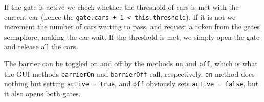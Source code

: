 If the gate is active we check whether the threshold of cars is met with the current car (hence the \texttt{gate.cars + 1 < this.threshold}). If it is not we increment the number of cars waiting to pass, and request a token from the gates semaphore, making the car wait. If the threshold is met, we simply open the gate and release all the cars.

The barrier can be toggled on and off by the methods \texttt{on} and \texttt{off}, which is what the GUI methods \texttt{barrierOn} and \texttt{barrierOff} call, respectively. \texttt{on} method does nothing but setting \texttt{active = true}, and \texttt{off} obviously sets \texttt{active = false}, but it also opens both gates.

